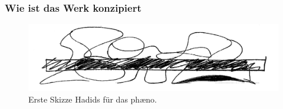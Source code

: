 \documentclass[a4paper, 12p]{article}
\begin{document}
\subsubsection{Wie ist das Werk konzipiert}

\begin{figure}[h]
\centering
\includegraphics[width=.5\linewidth]{paeno-sketch.jpg}
\caption{Erste Skizze Hadids für das phæno.\cite{article_creative_energy_sketches}}
\end{figure}
\end{document}
